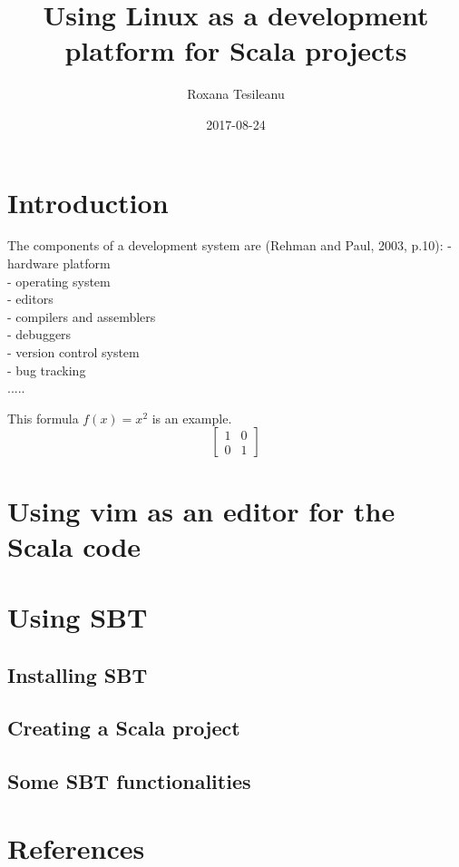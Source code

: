 \documentclass{article}
\title{Using Linux as a development platform for Scala projects}
\date{2017-08-24}
\author{Roxana Tesileanu}
\begin{document}
	\maketitle
	\newpage

\section{Introduction}
The components of a development system are (Rehman and Paul, 2003, p.10):\newline
- hardware platform \\
- operating system \\
- editors \\
- compilers and assemblers \\
- debuggers \\
- version control system \\
- bug tracking \\

.....

This formula $f(x) = x^2$ is an example.
\begin{equation}
\left[
\begin{matrix}
1 & 0 \\
0 & 1
\end{matrix}
\right]
\end{equation}
\section{Using vim as an editor for the Scala code}
\section{Using SBT}
\subsection{Installing SBT}
\subsection{Creating a Scala project}
\subsection{Some SBT functionalities}
\section{References}

  
\end{document}
